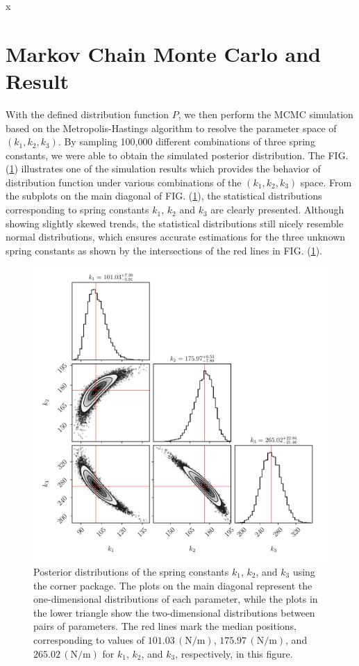 x\documentclass[12pt, a4paper, reprint, nofootinbib, twoside,  showkeys]{revtex4-1}
\begin{document}
\section{Markov Chain Monte Carlo and Result}
With the defined distribution function $P$, we then perform the MCMC simulation based on the Metropolis-Hastings algorithm to resolve the parameter space of $\left(k_1,k_2,k_3\right)$. By sampling 100,000 different combinations of three spring constants, we were able to obtain the simulated posterior distribution. The FIG. (\ref{fig:MCMC_corner}) illustrates one of the simulation results which provides the behavior of distribution function under various combinations of the $\left(k_1,k_2,k_3\right)$ space. From the subplots on the main diagonal of FIG. (\ref{fig:MCMC_corner}), the statistical distributions corresponding to spring constants $k_1$, $k_2$ and $k_3$ are clearly presented. Although showing slightly skewed trends, the statistical distributions still nicely resemble normal distributions, which ensures accurate estimations for the three unknown spring constants as shown by the intersections of the red lines in FIG. (\ref{fig:MCMC_corner}). 
\begin{figure}[h]
\centering
\includegraphics[width=\linewidth]{image/MCMC_corner.pdf}
\caption{Posterior distributions of the spring constants $k_1$, $k_2$, and $k_3$ using the corner package. The plots on the main diagonal represent the one-dimensional distributions of each parameter, while the plots in the lower triangle show the two-dimensional distributions between pairs of parameters. The red lines mark the median positions, corresponding to values of $101.03\,(\mathrm{N/m})$, $175.97\,(\mathrm{N/m})$, and $265.02\,(\mathrm{N/m})$ for $k_1$, $k_2$, and $k_3$, respectively, in this figure.}
\label{fig:MCMC_corner}
\end{figure}
\end{document}
